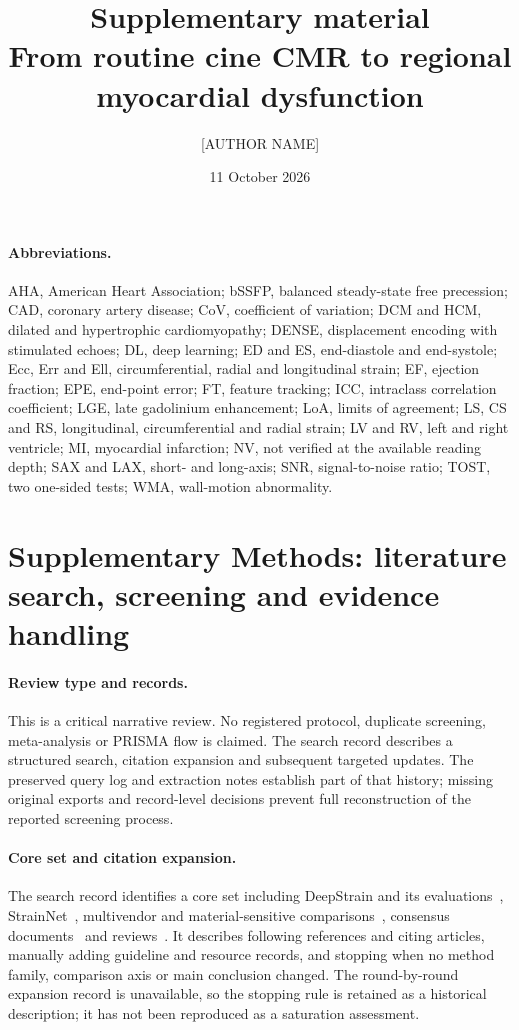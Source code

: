 \documentclass[11pt,a4paper]{article}
\title{\textbf{Supplementary material}\\[0.3em]
\large From routine cine CMR to regional myocardial dysfunction}
\author{[AUTHOR NAME]}
\date{11 October 2026}
\begin{document}
\maketitle
\vspace{1.2em}

\paragraph{Abbreviations.} AHA, American Heart Association; bSSFP, balanced steady-state free precession; CAD, coronary artery disease; CoV, coefficient of variation; DCM and HCM, dilated and hypertrophic cardiomyopathy; DENSE, displacement encoding with stimulated echoes; DL, deep learning; ED and ES, end-diastole and end-systole; Ecc, Err and Ell, circumferential, radial and longitudinal strain; EF, ejection fraction; EPE, end-point error; FT, feature tracking; ICC, intraclass correlation coefficient; LGE, late gadolinium enhancement; LoA, limits of agreement; LS, CS and RS, longitudinal, circumferential and radial strain; LV and RV, left and right ventricle; MI, myocardial infarction; NV, not verified at the available reading depth; SAX and LAX, short- and long-axis; SNR, signal-to-noise ratio; TOST, two one-sided tests; WMA, wall-motion abnormality.

\section*{Supplementary Methods: literature search, screening and evidence handling}

\paragraph{Review type and records.} This is a critical narrative review. No registered protocol, duplicate screening, meta-analysis or PRISMA flow is claimed. The search record describes a structured search, citation expansion and subsequent targeted updates. The preserved query log and extraction notes establish part of that history; missing original exports and record-level decisions prevent full reconstruction of the reported screening process.

\paragraph{Core set and citation expansion.} The search record identifies a core set including DeepStrain and its evaluations~\cite{morales2021,morales2022comparison,mrxcat2023}, StrainNet~\cite{wang2023strainnet}, multivendor and material-sensitive comparisons~\cite{militaru2021,cao2018,wehner2018,kihlberg2020clinical}, consensus documents~\cite{voigt2015,puntmann2018,schulzmenger2020,hundley2022} and reviews~\cite{amzulescu2019,duchateau2020,smiseth2025,monfared2026review,hussein2026review}. It describes following references and citing articles, manually adding guideline and resource records, and stopping when no method family, comparison axis or main conclusion changed. The round-by-round expansion record is unavailable, so the stopping rule is retained as a historical description; it has not been reproduced as a saturation assessment.
\end{document}
